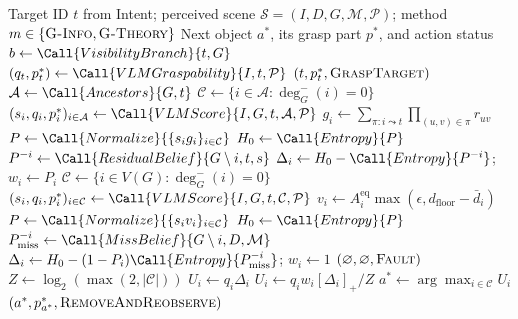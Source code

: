 %
\algrenewcommand{}
\algrenewcommand{}
\begin{algorithm}[t]
  \caption{Graspability-aware reasoning with
  \emph{graspability-info} (\textsc{G-Info}) and
  \emph{graspability-theory} (\textsc{G-Theory}).}
  \label{alg:graspability_reason}
  \small
  \begin{algorithmic}[1]
    \Require Target ID $t$ from Intent; perceived scene
      $\mathcal{S}=(I,D,G,\mathcal{M},\mathcal{P})$; method
      $m\in\{\textsc{G-Info},\textsc{G-Theory}\}$
    \Ensure Next object $a^*$, its grasp part $p^*$, and action status
    \State $b\gets\Call{VisibilityBranch}{t,G}$
      \State $(q_t,p_t^*)\gets\Call{VLMGraspability}{I,t,\mathcal{P}}$
      \State \Return $(t,p_t^*,\textsc{GraspTarget})$
      \State $\mathcal{A}\gets\Call{Ancestors}{G,t}$
      \State $\mathcal{C}\gets\{i\in\mathcal{A}:\deg_G^-(i)=0\}$
      \State $(s_i,q_i,p_i^*)_{i\in\mathcal{A}}
        \gets\Call{VLMScore}{I,G,t,\mathcal{A},\mathcal{P}}$
        \State $g_i\gets\sum_{\pi:i\leadsto t}\prod_{(u,v)\in\pi}r_{uv}$
      \EndFor
      \State $P\gets\Call{Normalize}{\{s_i g_i\}_{i\in\mathcal{C}}}$
      \State $H_0\gets\Call{Entropy}{P}$
        \State $P^{-i}\gets\Call{ResidualBelief}{G\setminus i,t,s}$
        \State $\Delta_i\gets H_0-\Call{Entropy}{P^{-i}}$; $w_i\gets P_i$
      \EndFor
      \State $\mathcal{C}\gets\{i\in V(G):\deg_G^-(i)=0\}$
      \State $(s_i,q_i,p_i^*)_{i\in\mathcal{C}}
        \gets\Call{VLMScore}{I,G,t,\mathcal{C},\mathcal{P}}$
        \State $v_i\gets A_i^{\mathrm{eq}}
          \max(\epsilon,d_{\mathrm{floor}}-\bar d_i)$
      \EndFor
      \State $P\gets\Call{Normalize}{\{s_i v_i\}_{i\in\mathcal{C}}}$
      \State $H_0\gets\Call{Entropy}{P}$
        \State $P_{\mathrm{miss}}^{-i}\gets
          \Call{MissBelief}{G\setminus i,D,\mathcal{M}}$
        \State $\Delta_i\gets H_0-(1-P_i)
          \Call{Entropy}{P_{\mathrm{miss}}^{-i}}$; $w_i\gets1$
      \EndFor
    \Else
      \State \Return $(\varnothing,\varnothing,\textsc{Fault})$
    \EndIf
    \State $Z\gets\log_2(\max(2,|\mathcal{C}|))$
        \State $U_i\gets q_i\Delta_i$
      \Else
        \State $U_i\gets q_i w_i[\Delta_i]_+/Z$
      \EndIf
    \EndFor
    \State $a^*\gets\arg\max_{i\in\mathcal{C}}U_i$
    \State \Return $(a^*,p_{a^*}^*,\textsc{RemoveAndReobserve})$
  \end{algorithmic}
\end{algorithm}
